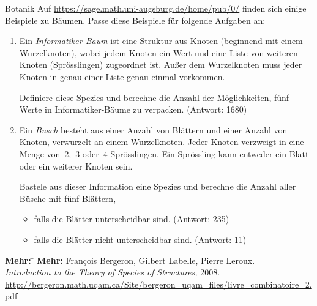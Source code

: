 \documentclass{pizzablatt}
\begin{document}
\begin{aufgabe}{Botanik}
Auf \url{https://sage.math.uni-augsburg.de/home/pub/0/} finden sich einige
Beispiele zu Bäumen. Passe diese Beispiele für folgende Aufgaben an:
\begin{enumerate}
\item Ein \emph{Informatiker-Baum} ist eine Struktur aus Knoten (beginnend
mit einem Wurzelknoten), wobei jedem Knoten ein Wert und eine Liste von
weiteren Knoten (Sprösslingen) zugeordnet ist. Außer dem Wurzelknoten muss
jeder Knoten in genau einer Liste genau einmal vorkommen.

Definiere diese Spezies und berechne die Anzahl der Möglichkeiten, fünf Werte in Informatiker-Bäume zu verpacken. (Antwort: 1680)
\item Ein \emph{Busch} besteht aus einer Anzahl von Blättern und einer Anzahl
von Knoten, verwurzelt an einem Wurzelknoten. Jeder Knoten verzweigt in eine
Menge von~2,~3 oder~4 Sprösslingen. Ein Sprössling kann entweder ein Blatt oder
ein weiterer Knoten sein.

Bastele aus dieser Information eine Spezies und
berechne die Anzahl aller Büsche mit fünf Blättern,
\begin{itemize}
\item falls die Blätter unterscheidbar sind. (Antwort: 235)
\item falls die Blätter nicht unterscheidbar sind. (Antwort: 11)
\end{itemize}
\end{enumerate}
\end{aufgabe}

\begin{tabbing}
  \textbf{Mehr:} \= \kill
  \textbf{Mehr:} \>
  François Bergeron, Gilbert Labelle, Pierre Leroux. \\
  \> \emph{Introduction to the Theory of Species of Structures,} 2008.\\
  \> \small
  \url{http://bergeron.math.uqam.ca/Site/bergeron_uqam_files/livre_combinatoire_2.pdf}
\end{tabbing}
\end{document}

